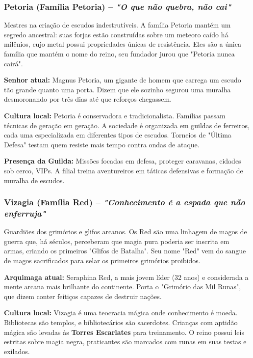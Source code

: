 \subsubsection*{Petoria (Família Petoria) – \textit{"O que não quebra, não cai"}}
Mestres na criação de escudos indestrutíveis. A família Petoria mantém um segredo ancestral: suas forjas estão construídas sobre um meteoro caído há milênios, cujo metal possui propriedades únicas de resistência. Eles são a única família que mantém o nome do reino, seu fundador jurou que "Petoria nunca cairá".

\textbf{\ringmfamily Senhor atual:} Magnus Petoria, um gigante de homem que carrega um escudo tão grande quanto uma porta. Dizem que ele sozinho segurou uma muralha desmoronando por três dias até que reforços chegassem.

\textbf{\ringmfamily Cultura local:} Petoria é conservadora e tradicionalista. Famílias passam técnicas de geração em geração. A sociedade é organizada em guildas de ferreiros, cada uma especializada em diferentes tipos de escudos. Torneios de "Última Defesa" testam quem resiste mais tempo contra ondas de ataque.

\textbf{\ringmfamily Presença da Guilda:} Missões focadas em defesa, proteger caravanas, cidades sob cerco, VIPs. A filial treina aventureiros em táticas defensivas e formação de muralha de escudos.

\subsubsection*{Vizagia (Família Red) – \textit{"Conhecimento é a espada que não enferruja"}}
Guardiões dos grimórios e glifos arcanos. Os Red são uma linhagem de magos de guerra que, há séculos, perceberam que magia pura poderia ser inscrita em armas, criando os primeiros "Glifos de Batalha". Seu nome "Red" vem do sangue de magos sacrificados para selar os primeiros grimórios proibidos.

\textbf{\ringmfamily Arquimaga atual:} Seraphina Red, a mais jovem líder (32 anos) e considerada a mente arcana mais brilhante do continente. Porta o "Grimório das Mil Runas", que dizem conter feitiços capazes de destruir nações.

\textbf{\ringmfamily Cultura local:} Vizagia é uma teocracia mágica onde conhecimento é moeda. Bibliotecas são templos, e bibliotecários são sacerdotes. Crianças com aptidão mágica são levadas às \textbf{Torres Escarlates} para treinamento. O reino possui leis estritas sobre magia negra, praticantes são marcados com runas em suas testas e exilados.

